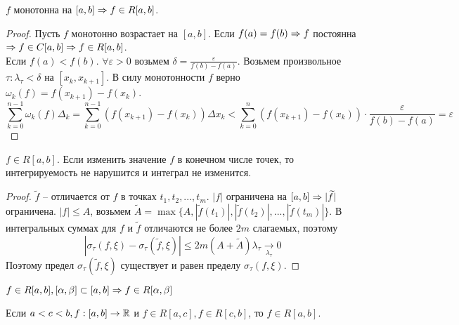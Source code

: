 \begin{Thm}
	$f$ монотонна на $[a, b] \Rightarrow f \in R[a, b]$. 
\end{Thm}

\begin{proof}
	Пусть $f$ монотонно возрастает на $[a, b]$. Если $f(a) = f(b) \Rightarrow f$ постоянна $\Rightarrow f \in C[a, b] \Rightarrow f \in R[a, b]$. \\
	Если $f(a) < f(b)$. $\forall \varepsilon > 0$ возьмем $\delta = \frac{\varepsilon}{f(b) - f(a)}$. Возьмем произвольное $\tau : \lambda_\tau < \delta$ на $[x_k, x_{k + 1}]$. В силу монотонности $f$ верно $\omega_k(f) = f(x_{k + 1}) - f(x_k)$.
	\[\sum_{k = 0}^{n - 1} \omega_k(f) \Delta_k = \sum_{k = 0}^{n - 1} (f(x_{k + 1}) - f(x_k)) \Delta x_k < \sum_{k = 0}^n (f(x_{k + 1}) - f(x_k)) \cdot \frac{\varepsilon}{f(b) - f(a)} = \varepsilon\]   
\end{proof}

\begin{Rem}
	$f \in R[a, b]$. Если изменить значение $f$ в конечном числе точек, то интегрируемость не нарушится и интеграл не изменится.
\end{Rem}

\begin{proof}
	$\widetilde{f}$ -- отличается от $f$ в точках $t_1, t_2, ..., t_m$.
	$|f|$ ограничена на $[a, b] \Rightarrow |\widetilde{f}|$ ограничена.
	$|f| \leqslant A$, возьмем $\widetilde{A} = \max \{A, |\widetilde{f}(t_1)|, |\widetilde{f}(t_2)|, ..., |\widetilde{f}(t_m)|\}$.
	В интегральных суммах для $f$ и $\widetilde{f}$ отличаются не более $2m$ слагаемых, поэтому
	\[|\sigma_\tau(f, \xi) - \sigma_\tau(\widetilde{f}, \xi)| \leqslant 2m(A + \widetilde{A}) \lambda_\tau \xrightarrow[\lambda_\tau]{}0\]  
	Поэтому предел $\sigma_\tau (\widetilde{f}, \xi)$ существует и равен пределу $\sigma_\tau (f, \xi)$.  
\end{proof}

\begin{Thm}
	\begin{MyList}
		\item $f \in R[a, b], [\alpha, \beta] \subset [a, b] \Rightarrow f \in R[\alpha, \beta]$
		\item Если $a < c < b, f : [a, b] \to \mathbb{R}$ и $f \in R[a, c], f \in R[c, b]$, то $f \in R[a, b]$.   
	\end{MyList}
\end{Thm}

